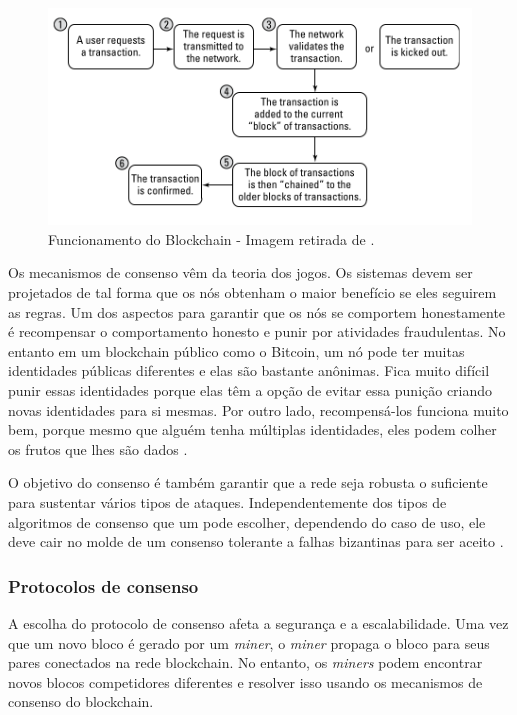         
                \begin{figure}[H]
                     \centering
                     \includegraphics[scale=0.7]{figuras/capitulo_2/blockchain_come_to_agreement.png}
                     \caption{Funcionamento do Blockchain - Imagem retirada de \cite{blockchain_for_dummies}.}
                     \label{fig:blockchain_work_dummies}
                \end{figure}
        
        Os mecanismos de consenso vêm da teoria dos jogos. Os sistemas devem ser projetados de tal forma que os nós obtenham o maior benefício se eles seguirem as regras. Um dos aspectos para garantir que os nós se comportem honestamente é recompensar o comportamento honesto e punir por atividades fraudulentas. No entanto em um blockchain público como o Bitcoin, um nó pode ter muitas identidades públicas diferentes e elas são bastante anônimas. Fica muito difícil punir essas identidades porque elas têm a opção de evitar essa punição criando novas identidades para si mesmas. Por outro lado, recompensá-los funciona muito bem, porque mesmo que alguém tenha múltiplas identidades, eles podem colher os frutos que lhes são dados \cite{beginnig_blockchain_bikramaditya}.
        
        O objetivo do consenso é também garantir que a rede seja robusta o suficiente para sustentar vários tipos de ataques. Independentemente dos tipos de algoritmos de consenso que um pode escolher, dependendo do caso de uso, ele deve cair no molde de um consenso tolerante a falhas bizantinas para ser aceito \cite{beginnig_blockchain_bikramaditya}.
        
        
        \subsubsection{Protocolos de consenso}

            A escolha do protocolo de consenso afeta a segurança e a escalabilidade. Uma vez que um novo bloco é gerado por um \textit{miner}, o \textit{miner} propaga o bloco para seus pares conectados na rede blockchain. No entanto, os \textit{miners} podem encontrar novos blocos competidores diferentes e resolver isso usando os mecanismos de consenso do blockchain.\cite{architecture_for_blockchain}
            
